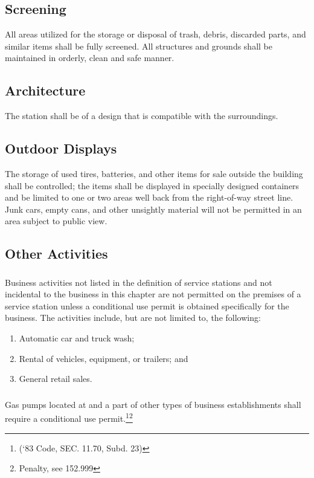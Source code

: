 \subsection{Screening}
All areas utilized for the storage or disposal of trash, debris, discarded parts, and similar items shall be fully screened.  All structures and grounds shall be maintained in orderly, clean and safe manner.
\subsection{Architecture}
The station shall be of a design that is compatible with the surroundings.
\subsection{Outdoor Displays}
The storage of used tires, batteries, and other items for sale outside the building shall be controlled; the items shall be displayed in specially designed containers and be limited to one or two areas well back from the right-of-way street line. Junk cars, empty cans, and other unsightly material will not be permitted in an area subject to public view.
\subsection{Other Activities}
\subsubsection{}
Business activities not listed in the definition of service stations and not incidental to the business in this chapter are not permitted on the premises of a service station unless a conditional use permit is obtained specifically for the business. The activities include, but are not limited to, the following:
\begin{enumerate}[{\indent}a)]
    \item Automatic car and truck wash; 
    \item Rental of vehicles, equipment, or trailers; and 
    \item General retail sales.
\end{enumerate}
\subsubsection{}
Gas pumps located at and a part of other types of business establishments shall require a conditional use permit.\footnote{(‘83 Code, SEC. 11.70, Subd. 23)}\footnote{Penalty, see 152.999}

